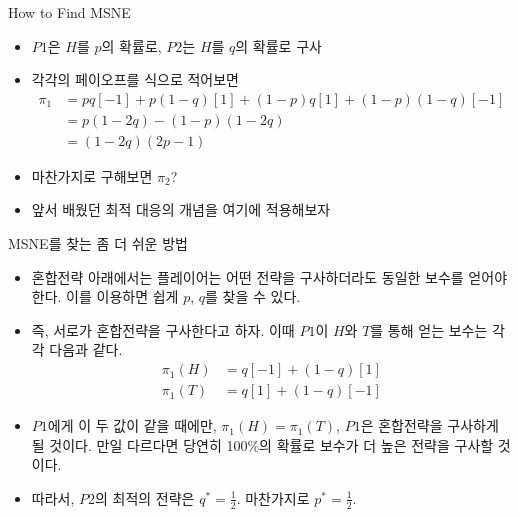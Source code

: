 \documentclass[final]{beamer}
\begin{document}
	\begin{frame}{How to Find MSNE}
	\begin{itemize}
	\item $P1$은 $H$를 $p$의 확률로, $P2$는 $H$를 $q$의 확률로 구사
	\item 각각의 페이오프를 식으로 적어보면
	\begin{align*}
	\pi_1 &= pq[-1]+p(1-q)[1]+(1-p)q[1]+(1-p)(1-q)[-1] \\
	         &=p(1-2q)-(1-p)(1-2q) \\
	         &=(1-2q)(2p-1)
	\end{align*}
	\item 마찬가지로 구해보면 $\pi_2$? 
	\item 앞서 배웠던 최적 대응의 개념을 여기에 적용해보자
	\end{itemize}
\end{frame}

\begin{frame}[t]{MSNE를 찾는 좀 더 쉬운 방법}
	\begin{itemize}
		\item 혼합전략 아래에서는 플레이어는 어떤 전략을 구사하더라도 동일한 보수를 얻어야 한다. 이를 이용하면 쉽게 $p$, $q$를 찾을 수 있다. 
		\item 즉, 서로가 혼합전략을 구사한다고 하자. 이때 $P1$이 $H$와 $T$를 통해 얻는 보수는 각각 다음과 같다. 
		\begin{align*}
			\pi_1 (H)&= q [-1] + (1-q) [1] \\
			\pi_1 (T)&= q [1] + (1-q) [-1] 
		\end{align*}
		\item $P1$에게 이 두 값이 같을 때에만, $\pi_1(H)=\pi_1(T)$, $P1$은 혼합전략을 구사하게 될 것이다. 만일 다르다면 당연히 100\%의 확률로 보수가 더 높은 전략을 구사할 것이다. 
		\item 따라서, $P2$의 최적의 전략은 $q^*=\frac{1}{2}$. 마찬가지로 $p^*=\frac{1}{2}$. 
	\end{itemize}
\end{frame}

\end{document}
